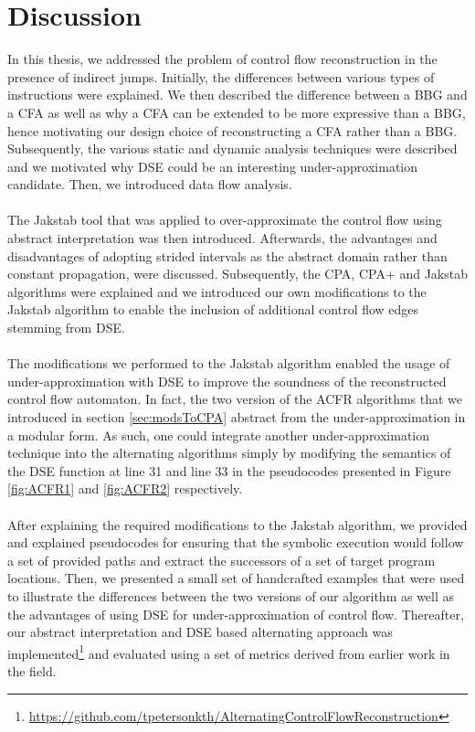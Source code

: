 \documentclass{kththesis}
\begin{document}
\section{Discussion}
In this thesis, we addressed the problem of control flow reconstruction in the presence of indirect jumps. Initially, the differences between various types of instructions were explained. We then described the difference between a BBG and a CFA as well as why a CFA can be extended to be more expressive than a BBG, hence motivating our design choice of reconstructing a CFA rather than a BBG. Subsequently, the various static and dynamic analysis techniques were described and we motivated why DSE could be an interesting under-approximation candidate. Then, we introduced data flow analysis.
\\ \\
The Jakstab tool that was applied to over-approximate the control flow using abstract interpretation was  then introduced. Afterwards, the advantages and disadvantages of adopting strided intervals as the abstract domain rather than constant propagation, were discussed. Subsequently, the CPA, CPA+ and Jakstab algorithms were explained and we introduced our own modifications to the Jakstab algorithm to enable the inclusion of additional control flow edges stemming from DSE.
\\ \\ 
The modifications we performed to the Jakstab algorithm enabled the usage of under-approximation with DSE to improve the soundness of the reconstructed control flow automaton. In fact, the two version of the ACFR algorithms that we introduced in section \ref{sec:modsToCPA} abstract from the under-approximation in a modular form. As such, one could integrate another under-approximation technique into the alternating algorithms simply by modifying the semantics of the DSE function at line 31 and line 33 in the pseudocodes presented in Figure \ref{fig:ACFR1} and \ref{fig:ACFR2} respectively.
\\ \\
After explaining the required modifications to the Jakstab algorithm, we provided and explained pseudocodes for ensuring that the symbolic execution would follow a set of provided paths and extract the successors of a set of target program locations. Then, we presented a small set of handcrafted examples that were used to illustrate the differences between the two versions of our algorithm as well as the advantages of using DSE for under-approximation of control flow. Thereafter, our abstract interpretation and DSE based alternating approach was implemented\footnote{ \url{https://github.com/tpetersonkth/AlternatingControlFlowReconstruction}} and evaluated using a set of metrics derived from earlier work in the field. 
\end{document}

